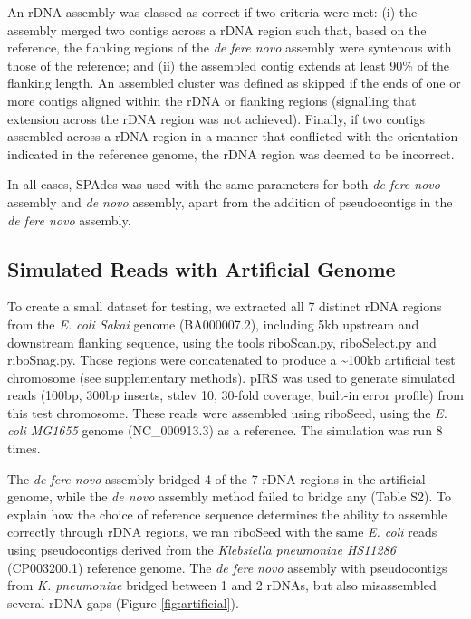 \documentclass[a4,center,fleqn]{NAR}
\begin{document}
An rDNA assembly was classed as correct if two criteria were met: (i) the assembly merged two contigs across a rDNA region such that, based on the reference, the flanking regions of the \textit{de fere novo} assembly were syntenous with those of the reference; and (ii) the assembled contig extends at least 90\% of the flanking length. An assembled cluster was defined as skipped if the ends of one or more contigs aligned within the rDNA or flanking regions (signalling that extension across the rDNA region was not achieved). Finally, if two contigs assembled across a rDNA region in a manner that conflicted with the orientation indicated in the reference genome, the rDNA region was deemed to be incorrect.

In all cases, SPAdes was used with the same parameters for both \textit{de fere novo} assembly and \textit{de novo} assembly, apart from the addition of pseudocontigs in the \textit{de fere novo} assembly.

\subsection*{Simulated Reads with Artificial Genome}
To create a small dataset for testing, we extracted all 7 distinct rDNA regions from the \textit{E. coli Sakai} genome (BA000007.2), including 5kb upstream and downstream flanking sequence, using the tools riboScan.py, riboSelect.py and riboSnag.py. Those regions were concatenated to produce a \textasciitilde100kb artificial test chromosome (see supplementary methods). pIRS\cite{Hu2012} was used to generate simulated reads (100bp, 300bp inserts, stdev 10, 30-fold coverage, built-in error profile) from this test chromosome. These reads were assembled using riboSeed, using the \textit{E. coli MG1655} genome (NC\_000913.3) as a reference.  The simulation was run 8 times.


The \textit{de fere novo} assembly bridged 4 of the 7 rDNA regions in the artificial genome, while the \textit{de novo} assembly method failed to bridge any (Table S2). To explain how the choice of reference sequence determines the ability to assemble correctly through rDNA regions, we ran riboSeed with the same \textit{E. coli} reads using pseudocontigs derived from the \textit{Klebsiella pneumoniae HS11286} (CP003200.1) reference genome\cite{Liu2012}. The \textit{de fere novo} assembly with pseudocontigs from \textit{K. pneumoniae} bridged between 1 and 2 rDNAs, but also misassembled  several rDNA gaps (Figure \ref{fig:artificial}).
\end{document}

